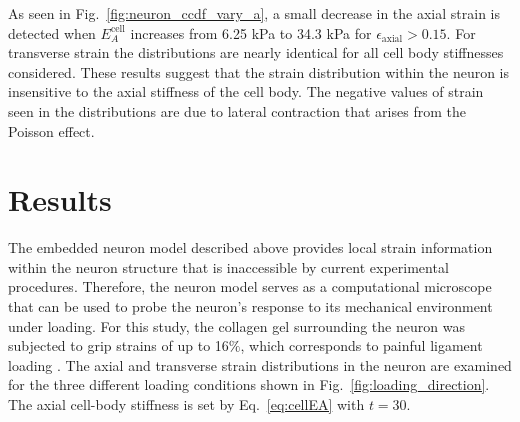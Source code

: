 \documentclass[]{interact}
\begin{document}
As seen in Fig.\ \ref{fig:neuron_ccdf_vary_a}, a small decrease in the axial strain is detected when $E_A^{\text{cell}}$ increases from 6.25 kPa to 34.3 kPa for $\epsilon_{\text{axial}} > 0.15$. For transverse strain the distributions are nearly identical for all cell body stiffnesses considered. These results suggest that the strain distribution within the neuron is insensitive to the axial stiffness of the cell body. The negative values of strain seen in the distributions are due to lateral contraction that arises from the Poisson effect.

\section{Results}
\label{sec:results}

The embedded neuron model described above provides local strain information within the neuron structure that is inaccessible by current experimental procedures. Therefore, the neuron model serves as a computational microscope that can be used to probe the  neuron's response to its mechanical environment under loading. For this study, the collagen gel surrounding the neuron was subjected to grip strains of up to 16$\%$, which corresponds to painful ligament loading \citep{Zhang:2016ga}. The axial and transverse strain distributions in the neuron are examined for the three different loading conditions shown in Fig.\ \ref{fig:loading_direction}. The axial cell-body stiffness is set by Eq.\ \eqref{eq:cellEA} with $t=30$. 
\end{document}
